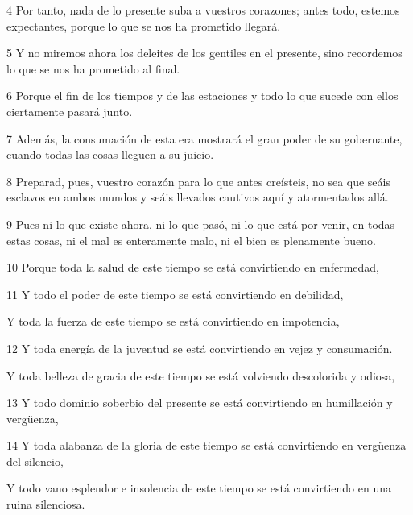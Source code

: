 \par 4 Por tanto, nada de lo presente suba a vuestros corazones; antes todo, estemos expectantes, porque lo que se nos ha prometido llegará.

\par 5 Y no miremos ahora los deleites de los gentiles en el presente, sino recordemos lo que se nos ha prometido al final.

\par 6 Porque el fin de los tiempos y de las estaciones y todo lo que sucede con ellos ciertamente pasará junto.

\par 7 Además, la consumación de esta era mostrará el gran poder de su gobernante, cuando todas las cosas lleguen a su juicio.

\par 8 Preparad, pues, vuestro corazón para lo que antes creísteis, no sea que seáis esclavos en ambos mundos y seáis llevados cautivos aquí y atormentados allá.

\par 9 Pues ni lo que existe ahora, ni lo que pasó, ni lo que está por venir, en todas estas cosas, ni el mal es enteramente malo, ni el bien es plenamente bueno.

\par 10 Porque toda la salud de este tiempo se está convirtiendo en enfermedad,

\par 11 Y todo el poder de este tiempo se está convirtiendo en debilidad,

\par Y toda la fuerza de este tiempo se está convirtiendo en impotencia,

\par 12 Y toda energía de la juventud se está convirtiendo en vejez y consumación.

\par Y toda belleza de gracia de este tiempo se está volviendo descolorida y odiosa,

\par 13 Y todo dominio soberbio del presente se está convirtiendo en humillación y vergüenza,

\par 14 Y toda alabanza de la gloria de este tiempo se está convirtiendo en vergüenza del silencio,

\par Y todo vano esplendor e insolencia de este tiempo se está convirtiendo en una ruina silenciosa.

